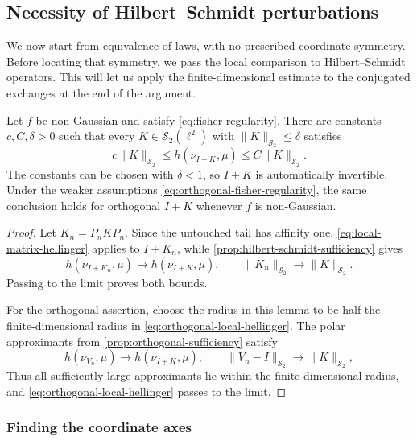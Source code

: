 \subsection{Necessity of Hilbert--Schmidt perturbations}

We now start from equivalence of laws, with no prescribed coordinate
symmetry. Before locating that symmetry, we pass the local comparison to
Hilbert--Schmidt operators. This will let us apply the finite-dimensional
estimate to the conjugated exchanges at the end of the argument.

\begin{lemma}
\label{lem:local-hs-coercivity}
Let $f$ be non-Gaussian and satisfy
\eqref{eq:fisher-regularity}.  There are constants
$c,C,\delta>0$ such that every $K\in\mathcal S_2(\ell^2)$ with
$\|K\|_{\mathcal S_2}\le\delta$ satisfies
\begin{equation}
 c\|K\|_{\mathcal S_2}
 \le h(\nu_{I+K},\mu)
 \le C\|K\|_{\mathcal S_2}.
\end{equation}
The constants can be chosen with $\delta<1$, so $I+K$ is
automatically invertible.  Under the weaker assumptions
\eqref{eq:orthogonal-fisher-regularity}, the same conclusion
holds for orthogonal $I+K$ whenever $f$ is non-Gaussian.
\end{lemma}

\begin{proof}
Let \(K_n=P_nKP_n\).  Since the untouched tail has affinity one,
\eqref{eq:local-matrix-hellinger} applies to \(I+K_n\), while
\cref{prop:hilbert-schmidt-sufficiency} gives
\[
 h(\nu_{I+K_n},\mu)
 \longrightarrow h(\nu_{I+K},\mu),
 \qquad \|K_n\|_{\mathcal S_2}\longrightarrow\|K\|_{\mathcal S_2}.
\]
Passing to the limit proves both bounds.

For the orthogonal assertion, choose the radius in this lemma to be half the
finite-dimensional radius in \eqref{eq:orthogonal-local-hellinger}.  The polar
approximants from \cref{prop:orthogonal-sufficiency} satisfy
\[
 h(\nu_{V_n},\mu)\longrightarrow h(\nu_{I+K},\mu),
 \qquad
 \|V_n-I\|_{\mathcal S_2}\longrightarrow\|K\|_{\mathcal S_2},
\]
Thus all sufficiently large approximants lie within the finite-dimensional
radius, and \eqref{eq:orthogonal-local-hellinger} passes to the limit.
\end{proof}

\subsubsection{Finding the coordinate axes}

